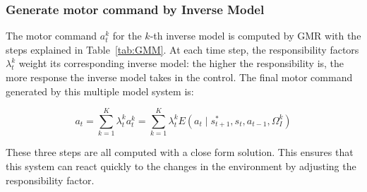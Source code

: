 \subsubsection{Generate motor command by Inverse Model}
\label{sec:inverse}

The motor command $a^k_t$ for the $k$-th inverse model is computed by GMR with the steps explained in Table~\ref{tab:GMM}. At each time step, the responsibility factors $\lambda^k_t$ weight its corresponding inverse model: the higher the responsibility is, the more response the inverse model takes in the control. The final motor command generated by this multiple model system is:

\begin{equation}
\label{e_mix}
a_t = \sum_{k=1}^K{\lambda_t^k a_t^k} = \sum_{k=1}^K{\lambda_t^k E\left({a_t \mid s^*_{t+1},s_t, a_{t-1}, \Omega^k_I}\right)}
\end{equation}

These three steps are all computed with a close form solution. This ensures that this system can react quickly to the changes in the environment by adjusting the responsibility factor.



